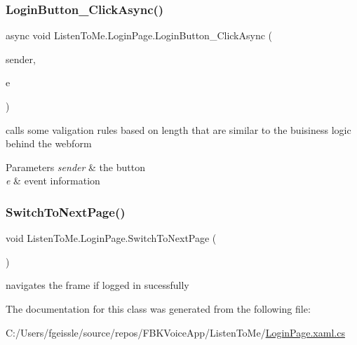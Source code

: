 \subsubsection{\texorpdfstring{Login\+Button\+\_\+\+Click\+Async()}{LoginButton\_ClickAsync()}}
{\footnotesize\ttfamily async void Listen\+To\+Me.\+Login\+Page.\+Login\+Button\+\_\+\+Click\+Async (\begin{DoxyParamCaption}\item[{object}]{sender,  }\item[{Routed\+Event\+Args}]{e }\end{DoxyParamCaption})\hspace{0.3cm}{\ttfamily [private]}}



calls some valigation rules based on length that are similar to the buisiness logic behind the webform 


\begin{DoxyParams}{Parameters}
{\em sender} & the button\\
\hline
{\em e} & event information\\
\hline
\end{DoxyParams}
\mbox{\label{class_listen_to_me_1_1_login_page_a3f7972af36ca0c72f1bd37c4a3f84c14}} 
\subsubsection{\texorpdfstring{Switch\+To\+Next\+Page()}{SwitchToNextPage()}}
{\footnotesize\ttfamily void Listen\+To\+Me.\+Login\+Page.\+Switch\+To\+Next\+Page (\begin{DoxyParamCaption}{ }\end{DoxyParamCaption})\hspace{0.3cm}{\ttfamily [private]}}



navigates the frame if logged in sucessfully 



The documentation for this class was generated from the following file\+:\begin{DoxyCompactItemize}
\item 
C\+:/\+Users/fgeissle/source/repos/\+F\+B\+K\+Voice\+App/\+Listen\+To\+Me/\mbox{\hyperlink{_login_page_8xaml_8cs}{Login\+Page.\+xaml.\+cs}}\end{DoxyCompactItemize}
